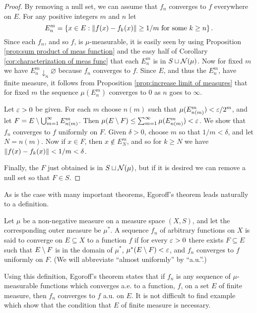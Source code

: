 \begin{proof}
By removing a null set, we can assume that $f_n$ converges to $f$ everywhere on $E$. For any positive integers $m$ and $n$ let $$E_n^m=\left\{x\in E:\norm{f(x)-f_k(x)}\geq 1/m\text{ for some }k\geq n\right\}.$$ Since each $f_n$, and so $f$, is $\mu$-measurable, it is easily seen by using Proposition \ref{prop:sum product of meas function} and the easy half of Corollary \ref{cor:characterization of meas func} that each $E_n^m$ is in $S \sqcup{\cal N}(\mu)$. Now for fixed $m$ we have $E_n^m\downarrow_n\varnothing$ because $f_n$ converges to $f$. Since $E$, and thus the $E_n^m$, have finite measure, it follows from Proposition \ref{prop:increase limit of measures} that for fixed $m$ the sequence $\mu(E_n^m)$ converges to $0$ as $n$ goes to $\infty$.

Let $\varepsilon>0$ be given. For each $m$ choose $n(m)$ such that $\mu(E_{n(m)}^m)<\varepsilon/2^m$, and let $F=E\setminus\bigcup_{m=1}^\infty E_{n(m)}^m$. Then $\mu(E\setminus F)\leq\sum_{m=1}^\infty\mu(E_{n(m)}^m)<\varepsilon$. We show that $f_n$ converges to $f$ uniformly on $F$. Given $\delta>0$, choose $m$ so that $1/m<\delta$, and let $N=n(m)$. Now if $x\in F$, then $x\notin E_N^m$, and so for $k\geq N$ we have $\norm{f(x)-f_k(x)}<1/m<\delta$.

Finally, the $F$ just obtained is in $S\sqcup{\cal N}(\mu)$, but if it is desired we can remove a null set so that $F\in S$.
\end{proof}

As is the case with many important theorems, Egoroff's theorem leads naturally to a definition.

\begin{definition}
Let $\mu$ be a non-negative measure on a measure space $(X,S)$, and let the corresponding outer measure be $\mu^*$. A sequence $f_n$ of arbitrary functions on $X$ is said to converge  on $E\subseteq X$ to a function $f$ if for every $\varepsilon>0$ there exists $F\subseteq E$ such that $E\setminus F$ is in the domain of $\mu^*$, $\mu^*(E\setminus F)<\varepsilon$, and $f_n$ converges to $f$ uniformly on $F$. (We will abbreviate ``almost uniformly'' by ``a.u.''.)
\end{definition}

Using this definition, Egoroff's theorem states that if $f_n$ is any sequence of $\mu$-measurable functions which converges a.e. to a function, $f$, on a set $E$ of finite measure, then $f_n$ converges to $f$ a.u. on $E$. It is not difficult to find example which show that the condition that $E$ of finite measure is necessary.

